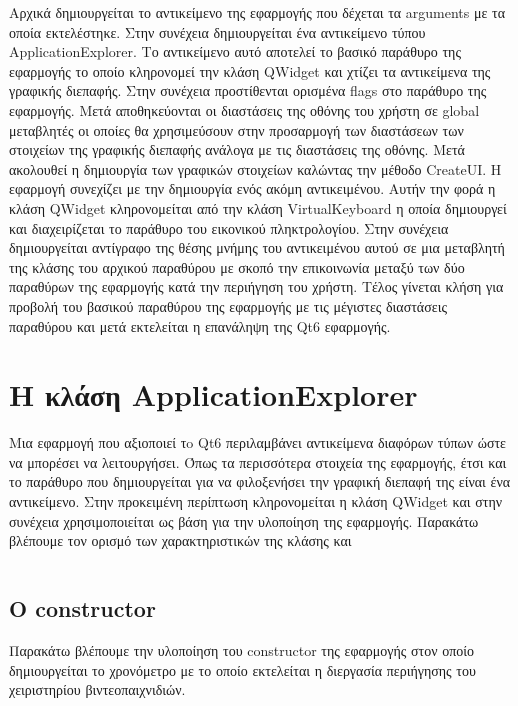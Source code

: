 Αρχικά δημιουργείται το αντικείμενο της εφαρμογής που δέχεται τα arguments με τα οποία εκτελέστηκε.
Στην συνέχεια δημιουργείται ένα αντικείμενο τύπου ApplicationExplorer. Το αντικείμενο αυτό αποτελεί
το βασικό παράθυρο της εφαρμογής το οποίο κληρονομεί την κλάση QWidget και χτίζει τα αντικείμενα της
γραφικής διεπαφής. Στην συνέχεια προστίθενται ορισμένα flags στο παράθυρο της εφαρμογής. Μετά αποθηκεύονται
οι διαστάσεις της οθόνης του χρήστη σε global μεταβλητές οι οποίες θα χρησιμεύσουν στην προσαρμογή των
διαστάσεων των στοιχείων της γραφικής διεπαφής ανάλογα με τις διαστάσεις της οθόνης. Μετά ακολουθεί η
δημιουργία των γραφικών στοιχείων καλώντας την μέθοδο CreateUI. Η εφαρμογή συνεχίζει με την δημιουργία
ενός ακόμη αντικειμένου. Αυτήν την φορά η κλάση QWidget κληρονομείται από την κλάση VirtualKeyboard
η οποία δημιουργεί και διαχειρίζεται το παράθυρο του εικονικού πληκτρολογίου. Στην συνέχεια δημιουργείται
αντίγραφο της θέσης μνήμης του αντικειμένου αυτού σε μια μεταβλητή της κλάσης του αρχικού παραθύρου με
σκοπό την επικοινωνία μεταξύ των δύο παραθύρων της εφαρμογής κατά την περιήγηση του χρήστη. Τέλος γίνεται
κλήση για προβολή του βασικού παραθύρου της εφαρμογής με τις μέγιστες διαστάσεις παραθύρου και μετά
εκτελείται η επανάληψη της Qt6 εφαρμογής. 


\section{Η κλάση ApplicationExplorer}


Μια εφαρμογή που αξιοποιεί τo Qt6 περιλαμβάνει αντικείμενα διαφόρων τύπων ώστε να
μπορέσει να λειτουργήσει. Όπως τα περισσότερα στοιχεία της εφαρμογής, έτσι και το
παράθυρο που δημιουργείται για να φιλοξενήσει την γραφική διεπαφή της είναι ένα αντικείμενο. 
Στην προκειμένη περίπτωση κληρονομείται η κλάση QWidget και στην συνέχεια χρησιμοποιείται 
ως βάση για την υλοποίηση της εφαρμογής. Παρακάτω βλέπουμε τον ορισμό των χαρακτηριστικών
της κλάσης και 


\begin{lstlisting}[language=C++, style=cppstyle]

\end{lstlisting}





\subsection{Ο constructor}
Παρακάτω βλέπουμε την υλοποίηση του constructor της εφαρμογής στον οποίο δημιουργείται 
το χρονόμετρο με το οποίο εκτελείται η διεργασία περιήγησης του χειριστηρίου βιντεοπαιχνιδιών.

